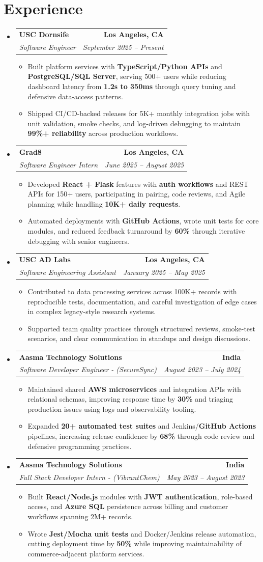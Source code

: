 \documentclass[letterpaper,10pt]{article}
\makeatletter
\newcommand{\resumeItem}[1]{\item\small{{#1 \vspace{-2pt}}}}
\newcommand{\resumeSubheading}[4]{\vspace{-1pt}\item\begin{tabular*}{1.0\textwidth}[t]{l@{\extracolsep{\fill}}r}\textbf{#1} & \textbf{\small #2} \\\textit{\small#3} & \textit{\small #4} \\\end{tabular*}\vspace{-2pt}}
\newcommand{\resumeSubHeadingListStart}{\begin{itemize}[leftmargin=0.0in, label={}]}
\newcommand{\resumeSubHeadingListEnd}{\end{itemize}}
\newcommand{\resumeItemListStart}{\begin{itemize}[leftmargin=0.15in,label=\textbullet,itemsep=2pt,topsep=0pt,parsep=0pt,partopsep=0pt]}
\newcommand{\resumeItemListEnd}{\end{itemize}\vspace{-4pt}}
\makeatother
\begin{document}
\section{Experience}
\resumeSubHeadingListStart
\resumeSubheading{USC Dornsife}{Los Angeles, CA}{Software Engineer}{September 2025 -- Present}
\resumeItemListStart
\resumeItem{Built platform services with \textbf{TypeScript/Python APIs} and \textbf{PostgreSQL/SQL Server}, serving 500+ users while reducing dashboard latency from \textbf{1.2s to 350ms} through query tuning and defensive data-access patterns.}
\resumeItem{Shipped CI/CD-backed releases for 5K+ monthly integration jobs with unit validation, smoke checks, and log-driven debugging to maintain \textbf{99\%+ reliability} across production workflows.}
\resumeItemListEnd
\resumeSubheading{Grad8}{Los Angeles, CA}{Software Engineer Intern}{June 2025 -- August 2025}
\resumeItemListStart
\resumeItem{Developed \textbf{React + Flask} features with \textbf{auth workflows} and REST APIs for 150+ users, participating in pairing, code reviews, and Agile planning while handling \textbf{10K+ daily requests}.}
\resumeItem{Automated deployments with \textbf{GitHub Actions}, wrote unit tests for core modules, and reduced feedback turnaround by \textbf{60\%} through iterative debugging with senior engineers.}
\resumeItemListEnd
\resumeSubheading{USC AD Labs}{Los Angeles, CA}{Software Engineering Assistant}{January 2025 -- May 2025}
\resumeItemListStart
\resumeItem{Contributed to data processing services across 100K+ records with reproducible tests, documentation, and careful investigation of edge cases in complex legacy-style research systems.}
\resumeItem{Supported team quality practices through structured reviews, smoke-test scenarios, and clear communication in standups and design discussions.}
\resumeItemListEnd
\resumeSubheading{Aasma Technology Solutions}{India}{Software Developer Engineer - (SecureSync)}{August 2023 -- July 2024}
\resumeItemListStart
\resumeItem{Maintained shared \textbf{AWS microservices} and integration APIs with relational schemas, improving response time by \textbf{30\%} and triaging production issues using logs and observability tooling.}
\resumeItem{Expanded \textbf{20+ automated test suites} and Jenkins/\textbf{GitHub Actions} pipelines, increasing release confidence by \textbf{68\%} through code review and defensive programming practices.}
\resumeItemListEnd
\resumeSubheading{Aasma Technology Solutions}{India}{Full Stack Developer Intern - (VibrantChem)}{May 2023 -- August 2023}
\resumeItemListStart
\resumeItem{Built \textbf{React/Node.js} modules with \textbf{JWT authentication}, role-based access, and \textbf{Azure SQL} persistence across billing and customer workflows spanning 2M+ records.}
\resumeItem{Wrote \textbf{Jest/Mocha unit tests} and Docker/Jenkins release automation, cutting deployment time by \textbf{50\%} while improving maintainability of commerce-adjacent platform services.}
\resumeItemListEnd
\resumeSubHeadingListEnd
\vspace{-14pt}
\end{document}
